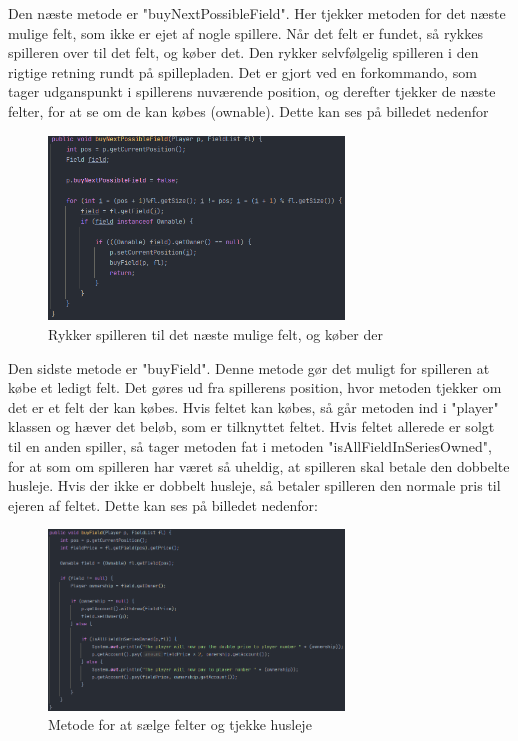 Den næste metode er "buyNextPossibleField". Her tjekker metoden for det næste mulige felt, som ikke er ejet af nogle spillere. Når det felt er fundet, så rykkes spilleren over til det felt, og køber det. Den rykker selvfølgelig spilleren i den rigtige retning rundt på spillepladen. Det er gjort ved en forkommando, som tager udganspunkt i spillerens nuværende position, og derefter tjekker de næste felter, for at se om de kan købes (ownable). Dette kan ses på billedet nedenfor
\begin{figure}[H]
    \centering
    \includegraphics[width=0.7\textwidth]{sources/7_implementering/BuyingControllerMethod2.PNG}
    \caption{Rykker spilleren til det næste mulige felt, og køber der}
    \label{fig:chance}
\end{figure}

Den sidste metode er "buyField". Denne metode gør det muligt for spilleren at købe et ledigt felt. Det gøres ud fra spillerens position, hvor metoden tjekker om det er et felt der kan købes. Hvis feltet kan købes, så går metoden ind i "player" klassen og hæver det beløb, som er tilknyttet feltet. Hvis feltet allerede er solgt til en anden spiller, så tager metoden fat i metoden "isAllFieldInSeriesOwned", for at som om spilleren har været så uheldig, at spilleren skal betale den dobbelte husleje. Hvis der ikke er dobbelt husleje, så betaler spilleren den normale pris til ejeren af feltet. Dette kan ses på billedet nedenfor:
\begin{figure}[H]
    \centering
    \includegraphics[width=0.7\textwidth]{sources/7_implementering/buyField.PNG}
    \caption{Metode for at sælge felter og tjekke husleje}
    \label{fig:chance}
\end{figure}
